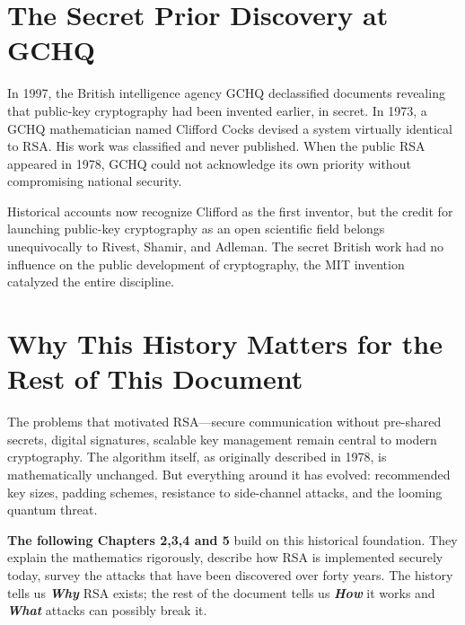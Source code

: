 \section{The Secret Prior Discovery at GCHQ}

In 1997, the British intelligence agency GCHQ declassified documents revealing that public-key cryptography had been invented earlier, in secret. In 1973, a GCHQ mathematician named Clifford Cocks devised a system virtually identical to RSA. His work was classified and never published. When the public RSA appeared in 1978, GCHQ could not acknowledge its own priority without compromising national security.

Historical accounts now recognize Clifford as the first inventor, but the credit for \linebreak launching public-key cryptography as an open scientific field belongs unequivocally to Rivest, Shamir, and Adleman. The secret British work had no influence on the public development of cryptography, the MIT invention catalyzed the entire discipline.

\section{Why This History Matters for the Rest of This Document}

The problems that motivated RSA—secure communication without pre-shared secrets, \linebreak digital signatures, scalable key management remain central to modern cryptography. \linebreak The algorithm itself, as originally described in 1978, is mathematically unchanged. But everything around it has evolved: recommended key sizes, padding schemes, resistance to side-channel attacks, and the looming quantum threat.

\vspace{2em}

\textbf{\large The following Chapters 2,3,4 and 5} build on this historical foundation. They explain the mathematics rigorously, describe how RSA is implemented securely today, survey the attacks that have been discovered over forty years. The history tells us \textbf{\emph{Why}} RSA exists; the rest of the document tells us \textbf{\emph{How}} it works and \textbf{\emph{What}} attacks can possibly break it.